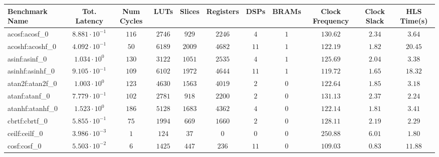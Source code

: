 \begin{tabular}{|l|c|c|c|c|c|c|c|c|c|c|}
\hline
Benchmark Name               & Tot. Latency            & Num Cycles & LUTs       & Slices    & Registers & DSPs    & BRAMs & Clock Frequency & Clock Slack & HLS Time(s) \\
\hline
acosf:acosf\_0               & $ 8.881 \cdot 10^{-1} $ & $ 116    $ & $ 2746   $ & $ 929   $ & $ 2246  $ & $ 4   $ & $ 1 $ & $ 130.62      $ & $ 2.34    $ & $ 3.64    $ \\
acoshf:acoshf\_0             & $ 4.092 \cdot 10^{-1} $ & $ 50     $ & $ 6189   $ & $ 2009  $ & $ 4682  $ & $ 11  $ & $ 1 $ & $ 122.19      $ & $ 1.82    $ & $ 20.45   $ \\
asinf:asinf\_0               & $ 1.034 \cdot 10^{0}  $ & $ 130    $ & $ 3122   $ & $ 1051  $ & $ 2535  $ & $ 4   $ & $ 1 $ & $ 125.69      $ & $ 2.04    $ & $ 3.38    $ \\
asinhf:asinhf\_0             & $ 9.105 \cdot 10^{-1} $ & $ 109    $ & $ 6102   $ & $ 1972  $ & $ 4644  $ & $ 11  $ & $ 1 $ & $ 119.72      $ & $ 1.65    $ & $ 18.32   $ \\
atan2f:atan2f\_0             & $ 1.003 \cdot 10^{0}  $ & $ 123    $ & $ 4630   $ & $ 1563  $ & $ 4019  $ & $ 2   $ & $ 0 $ & $ 122.64      $ & $ 1.85    $ & $ 3.18    $ \\
atanf:atanf\_0               & $ 7.779 \cdot 10^{-1} $ & $ 102    $ & $ 2781   $ & $ 918   $ & $ 2200  $ & $ 2   $ & $ 0 $ & $ 131.13      $ & $ 2.37    $ & $ 2.24    $ \\
atanhf:atanhf\_0             & $ 1.523 \cdot 10^{0}  $ & $ 186    $ & $ 5128   $ & $ 1683  $ & $ 4362  $ & $ 4   $ & $ 0 $ & $ 122.14      $ & $ 1.81    $ & $ 3.41    $ \\
cbrtf:cbrtf\_0               & $ 5.855 \cdot 10^{-1} $ & $ 75     $ & $ 1994   $ & $ 669   $ & $ 1660  $ & $ 2   $ & $ 0 $ & $ 128.11      $ & $ 2.19    $ & $ 2.29    $ \\
ceilf:ceilf\_0               & $ 3.986 \cdot 10^{-3} $ & $ 1      $ & $ 124    $ & $ 37    $ & $ 0     $ & $ 0   $ & $ 0 $ & $ 250.88      $ & $ 6.01    $ & $ 1.80    $ \\
cosf:cosf\_0                 & $ 5.503 \cdot 10^{-2} $ & $ 6      $ & $ 1425   $ & $ 447   $ & $ 236   $ & $ 11  $ & $ 0 $ & $ 109.03      $ & $ 0.83    $ & $ 11.88   $ \\

\end{tabular}
